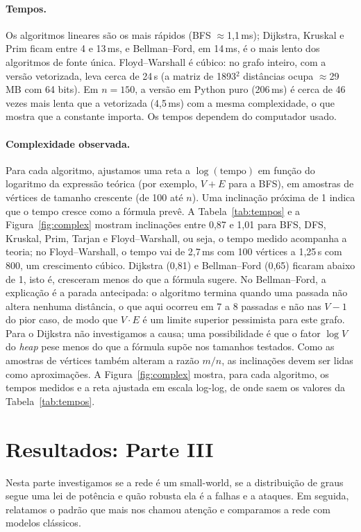 \documentclass[sigconf]{webmedia}
\begin{document}
\paragraph{Tempos.} Os algoritmos lineares são os mais rápidos (BFS $\approx$1,1\,ms); Dijkstra, Kruskal e Prim ficam entre 4 e 13\,ms, e Bellman--Ford, em 14\,ms, é o mais lento dos algoritmos de fonte única. Floyd--Warshall é cúbico: no grafo inteiro, com a versão vetorizada, leva cerca de 24\,s (a matriz de 1893$^2$ distâncias ocupa $\approx$29\,MB com 64 bits). Em $n=150$, a versão em Python puro (206\,ms) é cerca de 46 vezes mais lenta que a vetorizada (4,5\,ms) com a mesma complexidade, o que mostra que a constante importa. Os tempos dependem do computador usado.

\paragraph{Complexidade observada.} Para cada algoritmo, ajustamos uma reta a $\log(\text{tempo})$ em função do logaritmo da expressão teórica (por exemplo, $V+E$ para a BFS), em amostras de vértices de tamanho crescente (de 100 até $n$). Uma inclinação próxima de 1 indica que o tempo cresce como a fórmula prevê. A Tabela~\ref{tab:tempos} e a Figura~\ref{fig:complex} mostram inclinações entre 0,87 e 1,01 para BFS, DFS, Kruskal, Prim, Tarjan e Floyd--Warshall, ou seja, o tempo medido acompanha a teoria; no Floyd--Warshall, o tempo vai de 2,7\,ms com 100 vértices a 1,25\,s com 800, um crescimento cúbico. Dijkstra (0,81) e Bellman--Ford (0,65) ficaram abaixo de 1, isto é, cresceram menos do que a fórmula sugere. No Bellman--Ford, a explicação é a parada antecipada: o algoritmo termina quando uma passada não altera nenhuma distância, o que aqui ocorreu em 7 a 8 passadas e não nas $V-1$ do pior caso, de modo que $V\cdot E$ é um limite superior pessimista para este grafo. Para o Dijkstra não investigamos a causa; uma possibilidade é que o fator $\log V$ do \emph{heap} pese menos do que a fórmula supõe nos tamanhos testados. Como as amostras de vértices também alteram a razão $m/n$, as inclinações devem ser lidas como aproximações. A Figura~\ref{fig:complex} mostra, para cada algoritmo, os tempos medidos e a reta ajustada em escala log-log, de onde saem os valores da Tabela~\ref{tab:tempos}.

\FloatBarrier
\section{Resultados: Parte III}
Nesta parte investigamos se a rede é um small-world, se a distribuição de graus segue uma lei de potência e quão robusta ela é a falhas e a ataques. Em seguida, relatamos o padrão que mais nos chamou atenção e comparamos a rede com modelos clássicos.
\end{document}
